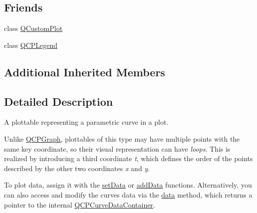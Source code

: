 \subsection*{Friends}
\begin{DoxyCompactItemize}
\item 
class \mbox{\hyperlink{class_q_c_p_curve_a1cdf9df76adcfae45261690aa0ca2198}{Q\+Custom\+Plot}}
\item 
class \mbox{\hyperlink{class_q_c_p_curve_a8429035e7adfbd7f05805a6530ad5e3b}{Q\+C\+P\+Legend}}
\end{DoxyCompactItemize}
\subsection*{Additional Inherited Members}


\subsection{Detailed Description}
A plottable representing a parametric curve in a plot. 



Unlike \mbox{\hyperlink{class_q_c_p_graph}{Q\+C\+P\+Graph}}, plottables of this type may have multiple points with the same key coordinate, so their visual representation can have {\itshape loops}. This is realized by introducing a third coordinate {\itshape t}, which defines the order of the points described by the other two coordinates {\itshape x} and {\itshape y}.

To plot data, assign it with the \mbox{\hyperlink{class_q_c_p_curve_a41246850d2e080bc57183ca19cd4135e}{set\+Data}} or \mbox{\hyperlink{class_q_c_p_curve_a73edf394b94f3f24f07518e30565a07f}{add\+Data}} functions. Alternatively, you can also access and modify the curve\textquotesingle{}s data via the \mbox{\hyperlink{class_q_c_p_curve_a761492fd00b1ab7cb18ce23c118c6c60}{data}} method, which returns a pointer to the internal \mbox{\hyperlink{qcustomplot_8h_aaeee80d5664ea91beb9d7968790d0e65}{Q\+C\+P\+Curve\+Data\+Container}}.

